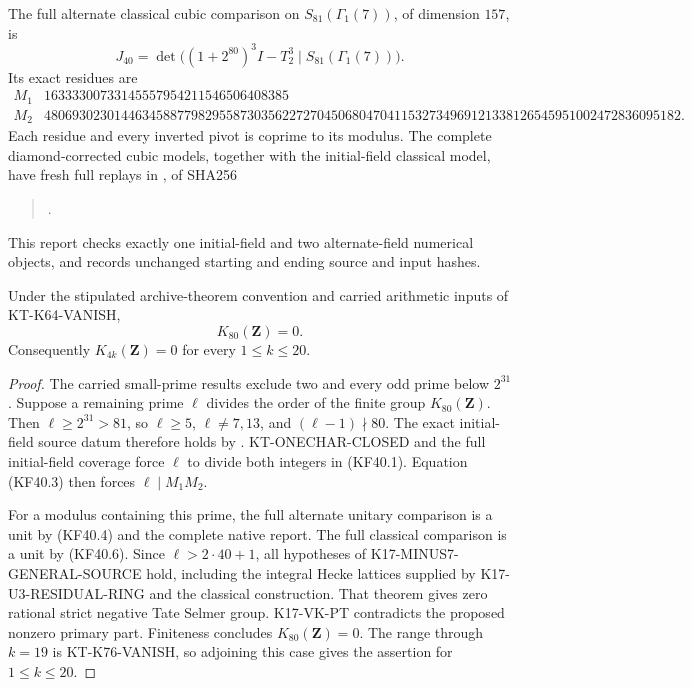 The full alternate classical cubic comparison on
$S_{81}(\Gamma_1(7))$, of dimension $157$, is
\[
 J_{40}=\det\bigl((1+2^{80})^3I-T_2^3
                              \mid S_{81}(\Gamma_1(7))\bigr).
                                                               \tag{KF40.5}
\]
Its exact residues are
{\scriptsize
\[
\begin{array}{c|r}
 M_1&16333300733145557954211546506408385\\
 M_2&4806930230144634588779829558730356227270450680470411532734969121338126545951002472836095182.
\end{array}                                                \tag{KF40.6}
\]
}
Each residue and every inverted pivot is coprime to its modulus.
The complete diamond-corrected cubic models, together with the
initial-field classical model, have fresh full replays in
, of SHA256
\begin{quote}\small
{}.
\end{quote}
This report checks exactly one initial-field and two
alternate-field numerical objects, and records unchanged
starting and ending source and input hashes.

\begin{theorem}[KT-K80-VANISH]
\label{thm:kt-k80-vanish}
Under the stipulated archive-theorem convention and carried
arithmetic inputs of KT-K64-VANISH,
\[
                         K_{80}(\mathbf Z)=0.
\]
Consequently $K_{4k}(\mathbf Z)=0$ for every $1\leq k\leq20$.
\end{theorem}
\begin{proof}
The carried small-prime results exclude two and every odd prime
below $2^{31}$.  Suppose a remaining prime $\ell$ divides
the order of the finite group $K_{80}(\mathbf Z)$.
Then $\ell\geq2^{31}>81$, so $\ell\geq5$, $\ell\ne7,13$,
and $(\ell-1)\nmid80$.  The exact initial-field source datum
therefore holds by .
KT-ONECHAR-CLOSED and the full initial-field coverage force
$\ell$ to divide both integers in (KF40.1).  Equation (KF40.3)
then forces $\ell\mid M_1M_2$.

For a modulus containing this prime, the full alternate
unitary comparison is a unit by (KF40.4) and the complete
native report.  The full classical comparison is a unit
by (KF40.6).  Since $\ell>2\cdot40+1$, all hypotheses of
K17-MINUS7-GENERAL-SOURCE hold, including the integral Hecke
lattices supplied by K17-U3-RESIDUAL-RING and the classical
construction.  That theorem gives zero rational strict
negative Tate Selmer group.  K17-VK-PT contradicts the
proposed nonzero primary part.  Finiteness concludes
$K_{80}(\mathbf Z)=0$.
The range through $k=19$ is KT-K76-VANISH, so adjoining this
case gives the assertion for $1\leq k\leq20$.
\end{proof}

